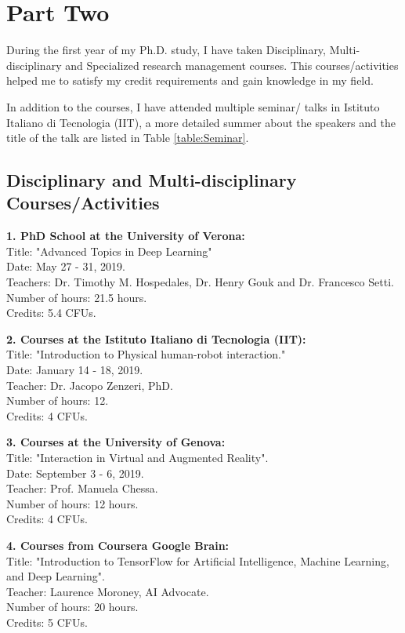 \chapter{Part Two}
During the first year of my Ph.D. study, I have taken Disciplinary, Multi-disciplinary and Specialized research management courses. This courses/activities helped me to satisfy my credit requirements and gain knowledge in my field.

In addition to the courses, I have attended multiple seminar/ talks in Istituto Italiano di Tecnologia (IIT), a more detailed summer about the speakers and the title of the talk are listed in Table \ref{table:Seminar}.

\section{Disciplinary and Multi-disciplinary Courses/Activities}

\textbf{1. PhD School at the University of Verona:}\\
Title: "Advanced Topics in Deep Learning"\\
Date:  May 27 - 31, 2019.\\
Teachers: Dr. Timothy M. Hospedales, Dr. Henry Gouk  and Dr. Francesco Setti.\\
Number of hours: 21.5 hours.\\ 
Credits: 5.4 CFUs.

\textbf{2. Courses at the Istituto Italiano di Tecnologia (IIT):}\\
Title: "Introduction to Physical human-robot interaction." \\
Date: January 14 - 18, 2019.\\ 
Teacher: Dr. Jacopo Zenzeri, PhD. \\
Number of hours: 12.\\
Credits: 4 CFUs. 

\textbf{3. Courses at the University of Genova:}\\
Title: "Interaction in Virtual and Augmented Reality".\\
Date: September 3 - 6, 2019. \\
Teacher: Prof. Manuela Chessa. \\
Number of hours: 12 hours. \\
Credits: 4 CFUs. 

\textbf{4. Courses from Coursera Google Brain:}\\
Title: "Introduction to TensorFlow for Artificial Intelligence, Machine Learning, and Deep Learning". \\ 
Teacher: Laurence Moroney, AI Advocate.\\
Number of hours: 20 hours.\\
Credits: 5 CFUs.

